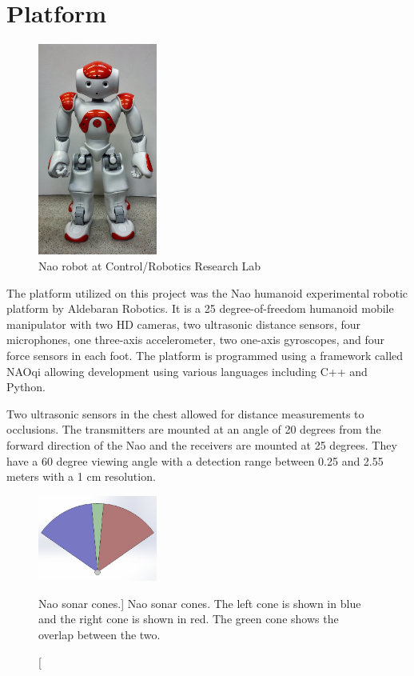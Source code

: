 \chapter{Platform}

\begin{figure}[H]
	\centering
	\includegraphics[width=0.35\textwidth]{nao1.jpg}
	\caption
	{Nao robot at Control/Robotics Research Lab}
	\label{fig:nao1}
\end{figure}

The platform utilized on this project was the Nao humanoid experimental robotic platform by Aldebaran Robotics. It is a 25 degree-of-freedom humanoid mobile manipulator with two HD cameras, two ultrasonic distance sensors, four microphones, one three-axis accelerometer, two one-axis gyroscopes, and four force sensors in each foot. The platform is programmed using a framework called NAOqi allowing development using various languages including C++ and Python. 

Two ultrasonic sensors in the chest allowed for distance measurements to occlusions. The transmitters are mounted at an angle of 20 degrees from the forward direction of the Nao and the receivers are mounted at 25 degrees. They have a 60 degree viewing angle with a detection range between 0.25 and 2.55 meters with a 1 cm resolution.

\begin{figure}[h]
	\centering
	\includegraphics[width=0.35\textwidth]{sonar1.jpg}
	\caption
	[Nao sonar cones.]
	{Nao sonar cones. The left cone is shown in blue and the right cone is shown in red. The green cone shows the overlap between the two.}
	\label{fig:sonar1}
\end{figure}

